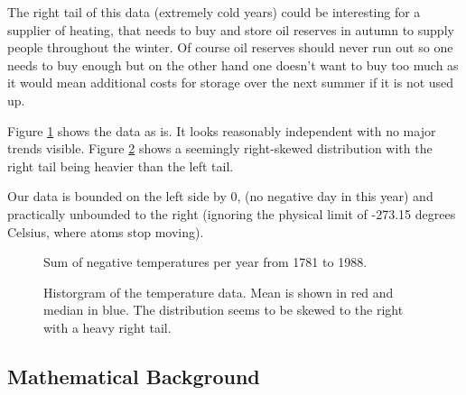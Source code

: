 \documentclass[11pt]{article}
\begin{document}
The right tail of this data (extremely cold years) could be interesting for a supplier of heating, that needs to buy and store oil reserves in autumn to supply people throughout the winter. Of course oil reserves should never run out so one needs to buy enough but on the other hand one doesn't want to buy too much as it would mean additional costs for storage over the next summer if it is not used up.

Figure \ref{fig:part1:raw_data} shows the data as is. It looks reasonably independent with no major trends visible. Figure \ref{fig:part1:hist_data} shows a seemingly right-skewed distribution with the right tail being heavier than the left tail.

Our data is bounded on the left side by 0, (no negative day in this year) and practically unbounded to the right (ignoring the physical limit of -273.15 degrees Celsius, where atoms stop moving).


\begin{figure}[!h]
 \center
  \def\svgwidth{0.7\columnwidth}
  
  \caption{Sum of negative temperatures per year from 1781 to 1988.}
  \label{fig:part1:raw_data}
\end{figure}

\begin{figure}[!h]
 \center
  \def\svgwidth{0.7\columnwidth}
  
  \caption{Historgram of the temperature data. Mean is shown in red and median in blue. The distribution seems to be skewed to the right with a heavy right tail.}
  \label{fig:part1:hist_data}
\end{figure}

\subsection*{Mathematical Background}
\end{document}

